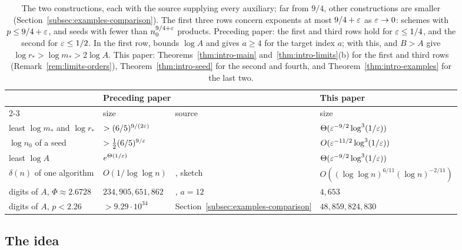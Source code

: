 \begin{table}[ht]
\centering
\small
\begin{tabular}{@{}llll@{}}
\toprule
 & \multicolumn{2}{l}{Preceding paper} & This paper\\
\cmidrule(r){2-3}
 & size & source & size\\
\midrule
least \(\log m_*\) and \(\log r_*\) & \(>(6/5)^{9/(2\varepsilon)}\)
 & \citep[Prop.~11.1(b)]{FinCon26}
 & \(\Theta(\varepsilon^{-9/2}\log^3(1/\varepsilon))\)\\
\(\log n_0\) of a seed & \(>\frac12(6/5)^{9/\varepsilon}\)
 & \citep[Cor.~11.2(c)]{FinCon26}
 & \(O(\varepsilon^{-11/2}\log^3(1/\varepsilon))\)\\
least \(\log A\) & \(e^{\Theta(1/\varepsilon)}\)
 & \citep[Cor.~11.2(b)]{FinCon26}
 & \(\Theta(\varepsilon^{-9/2}\log^3(1/\varepsilon))\)\\
\(\delta(n)\) of one algorithm & \(O(1/\log\log n)\)
 & \citep[Rem.~9.8]{FinCon26}, sketch
 & \(O((\log\log n)^{6/11}(\log n)^{-2/11})\)\\
digits of \(A\), \(\Phi\approx2.6728\) & \(234{,}905{,}651{,}862\)
 & \citep[Table~2]{FinCon26}, \(a=12\) & \(4{,}653\)\\
digits of \(A\), \(p<2.26\) & \(>9.29\cdot10^{34}\)
 & Section~\ref{subsec:examples-comparison} & \(48{,}859{,}824{,}830\)\\
\bottomrule
\end{tabular}
\caption{The two constructions, each with the source supplying every
auxiliary; far from \(9/4\), other constructions are smaller
(Section~\ref{subsec:examples-comparison}). The first three rows concern
exponents at most \(9/4+\varepsilon\) as \(\varepsilon\to0\): schemes with
\(p\le9/4+\varepsilon\), and seeds with fewer than \(n_0^{9/4+\varepsilon}\) products.
Preceding paper: the first and third rows hold for \(\varepsilon\le1/4\), and
the second for \(\varepsilon\le1/2\). In the first row,
\citep[Proposition~11.1(b)]{FinCon26} bounds \(\log A\) and gives
\(a\ge4\) for the target index \(a\); with this,
\citep[(7.3), (7.6) and~(11.2)]{FinCon26} and \(B>A\) give
\(\log r_*>\log m_*>2\log A\). This paper:
Theorems~\ref{thm:intro-main} and~\ref{thm:intro-limits}(b) for the
first and third rows (Remark~\ref{rem:limits-orders}),
Theorem~\ref{thm:intro-seed} for the second and fourth, and
Theorem~\ref{thm:intro-examples} for the last two.}
\label{tab:intro-comparison}
\end{table}

\subsection{The idea}
\label{subsec:intro-idea}

